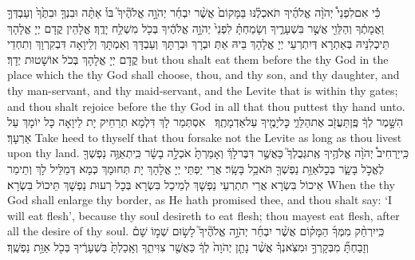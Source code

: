 {כִּ֡י אִם\maqqaf לִפְנֵי֩ יְהֹוָ֨ה אֱלֹהֶ֜יךָ תֹּאכְלֶ֗נּוּ בַּמָּקוֹם֙ אֲשֶׁ֨ר יִבְחַ֜ר יְהֹוָ֣ה אֱלֹהֶ֘יךָ֮ בּוֹ֒ אַתָּ֨ה וּבִנְךָ֤ וּבִתֶּ֙ךָ֙ וְעַבְדְּךָ֣ וַאֲמָתֶ֔ךָ וְהַלֵּוִ֖י אֲשֶׁ֣ר בִּשְׁעָרֶ֑יךָ וְשָׂמַחְתָּ֗ לִפְנֵי֙ יְהֹוָ֣ה אֱלֹהֶ֔יךָ בְּכֹ֖ל מִשְׁלַ֥ח יָדֶֽךָ׃}
{אֱלָהֵין קֳדָם יְיָ אֱלָהָךְ תֵּיכְלִנֵּיהּ בְּאַתְרָא דְּיִתְרְעֵי יְיָ אֱלָהָךְ בֵּיהּ אַתְּ וּבְרָךְ וּבְרַתָּךְ וְעַבְדָּךְ וְאַמְתָּךְ וְלֵיוָאָה דִּבְקִרְוָךְ וְתִחְדֵי קֳדָם יְיָ אֱלָהָךְ בְּכֹל אוֹשָׁטוּת יְדָךְ׃}
{but thou shalt eat them before the \lord\space thy God in the place which the \lord\space thy God shall choose, thou, and thy son, and thy daughter, and thy man-servant, and thy maid-servant, and the Levite that is within thy gates; and thou shalt rejoice before the \lord\space thy God in all that thou puttest thy hand unto.}{}
{הִשָּׁ֣מֶר לְךָ֔ פֶּֽן\maqqaf תַּעֲזֹ֖ב אֶת\maqqaf הַלֵּוִ֑י כׇּל\maqqaf יָמֶ֖יךָ עַל\maqqaf אַדְמָתֶֽךָ׃ \setuma }
{אִסְתְּמַר לָךְ דִּלְמָא תְרַחֵיק יָת לֵיוָאָה כָּל יוֹמָךְ עַל אַרְעָךְ׃}
{Take heed to thyself that thou forsake not the Levite as long as thou livest upon thy land.}{}
{כִּֽי\maqqaf יַרְחִיב֩ יְהֹוָ֨ה אֱלֹהֶ֥יךָ אֶֽת\maqqaf גְּבֻלְךָ֮ כַּאֲשֶׁ֣ר דִּבֶּר\maqqaf לָךְ֒ וְאָמַרְתָּ֙ אֹכְלָ֣ה בָשָׂ֔ר כִּֽי\maqqaf תְאַוֶּ֥ה נַפְשְׁךָ֖ לֶאֱכֹ֣ל בָּשָׂ֑ר בְּכׇל\maqqaf אַוַּ֥ת נַפְשְׁךָ֖ תֹּאכַ֥ל בָּשָֽׂר׃}
{אֲרֵי יַפְתֵּי יְיָ אֱלָהָךְ יָת תְּחוּמָךְ כְּמָא דְּמַלֵּיל לָךְ וְתֵימַר אֵיכוֹל בִּשְׂרָא אֲרֵי תִתְרְעֵי נַפְשָׁךְ לְמֵיכַל בִּשְׂרָא בְּכָל רְעוּת נַפְשָׁךְ תֵּיכוֹל בִּשְׂרָא׃}
{When the \lord\space thy God shall enlarge thy border, as He hath promised thee, and thou shalt say: ‘I will eat flesh’, because thy soul desireth to eat flesh; thou mayest eat flesh, after all the desire of thy soul.}{}
{כִּֽי\maqqaf יִרְחַ֨ק מִמְּךָ֜ הַמָּק֗וֹם אֲשֶׁ֨ר יִבְחַ֜ר יְהֹוָ֣ה אֱלֹהֶ֘יךָ֮ לָשׂ֣וּם שְׁמ֣וֹ שָׁם֒ וְזָבַחְתָּ֞ מִבְּקָרְךָ֣ וּמִצֹּֽאנְךָ֗ אֲשֶׁ֨ר נָתַ֤ן יְהֹוָה֙ לְךָ֔ כַּאֲשֶׁ֖ר צִוִּיתִ֑ךָ וְאָֽכַלְתָּ֙ בִּשְׁעָרֶ֔יךָ בְּכֹ֖ל אַוַּ֥ת נַפְשֶֽׁךָ׃}
